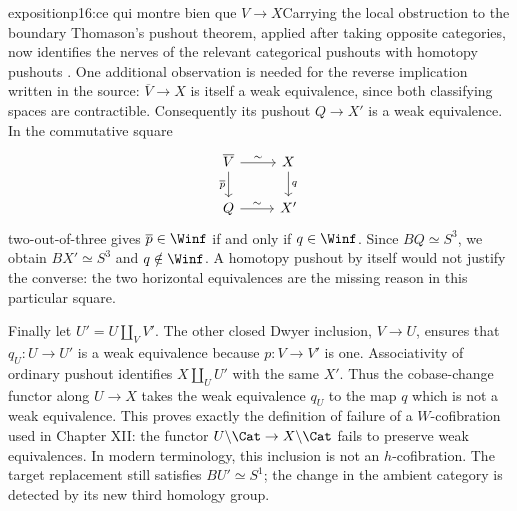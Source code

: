 \begin{dcomment}{exposition}{p16:ce qui montre bien que $V \longrightarrow X$}{Carrying the local obstruction to the boundary}
Thomason's pushout theorem, applied after taking opposite categories, now identifies the nerves of the relevant categorical pushouts with homotopy pushouts \citep[Proposition~4.3 and Corollary~4.4]{Thomason1980}. One additional observation is needed for the reverse implication written in the source: $\overline V\to X$ is itself a weak equivalence, since both classifying spaces are contractible. Consequently its pushout $Q\to X'$ is a weak equivalence. In the commutative square
\[
\begin{tikzcd}
\overline V\arrow[r,"\sim"]\arrow[d,"\overline p"']&X\arrow[d,"q"]\\
Q\arrow[r,"\sim"]&X'
\end{tikzcd}
\]
two-out-of-three gives $\overline p\in\Winf$ if and only if $q\in\Winf$. Since $BQ\simeq S^3$, we obtain $BX'\simeq S^3$ and $q\notin\Winf$. A homotopy pushout by itself would not justify the converse: the two horizontal equivalences are the missing reason in this particular square.

Finally let $U'=U\amalg_VV'$. The other closed Dwyer inclusion, $V\to U$, ensures that $q_U:U\to U'$ is a weak equivalence because $p:V\to V'$ is one. Associativity of ordinary pushout identifies $X\amalg_UU'$ with the same $X'$. Thus the cobase-change functor along $U\to X$ takes the weak equivalence $q_U$ to the map $q$ which is not a weak equivalence. This proves exactly the definition of failure of a $W$-cofibration used in Chapter XII: the functor $U\backslash\Cat\to X\backslash\Cat$ fails to preserve weak equivalences. In modern terminology, this inclusion is not an $h$-cofibration. The target replacement still satisfies $BU'\simeq S^1$; the change in the ambient category is detected by its new third homology group.
\end{dcomment}

